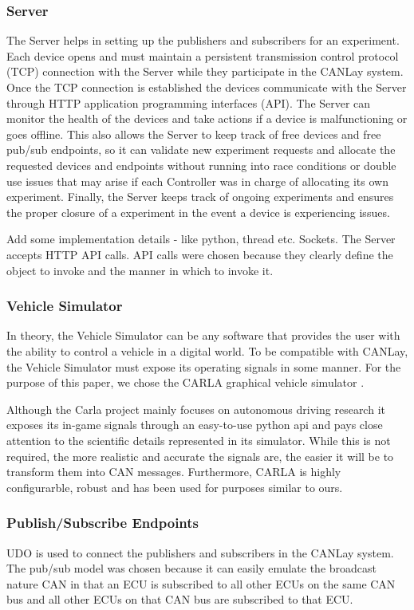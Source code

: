\documentclass[letterpaper,twocolumn,12pt]{article}
\begin{document}
\subsubsection{Server}
The Server helps in setting up the publishers and subscribers for an experiment. Each device opens and must maintain a persistent transmission control protocol (TCP) connection with the Server while they participate in the CANLay system. Once the TCP connection is established the devices communicate with the Server through HTTP application programming interfaces (API). The Server can monitor the health of the devices and take actions if a device is malfunctioning or goes offline. This also allows the Server to keep track of free devices and free pub/sub endpoints, so it can validate new experiment requests and allocate the requested devices and endpoints without running into race conditions or double use issues that may arise if each Controller was in charge of allocating its own experiment. Finally, the Server keeps track of ongoing experiments and ensures the proper closure of a experiment in the event a device is experiencing issues.

Add some implementation details - like python, thread etc. Sockets.
The Server accepts HTTP API calls. API calls were chosen because they clearly define the object to invoke and the manner in which to invoke it.

\subsubsection{Vehicle Simulator}
In theory, the Vehicle Simulator can be any software that provides the user with the ability to control a vehicle in a digital world. To be compatible with CANLay, the Vehicle Simulator must expose its operating signals in some manner. For the purpose of this paper, we chose the CARLA graphical vehicle simulator \cite{Dosovitskiy17}. 

Although the Carla project mainly focuses on autonomous driving research it exposes its in-game signals through an easy-to-use python api and pays close attention to the scientific details represented in its simulator. While this is not required, the more realistic and accurate the signals are, the easier it will be to transform them into CAN messages. Furthermore, CARLA is highly configurarble, robust and has been used for purposes similar to ours.

\subsubsection{Publish/Subscribe Endpoints}
UDO is used to connect the publishers and subscribers in the CANLay system. 
The pub/sub model was chosen because it can easily emulate the broadcast nature CAN in that an ECU is subscribed to all other ECUs on the same CAN bus and all other ECUs on that CAN bus are subscribed to that ECU. 
\end{document}
